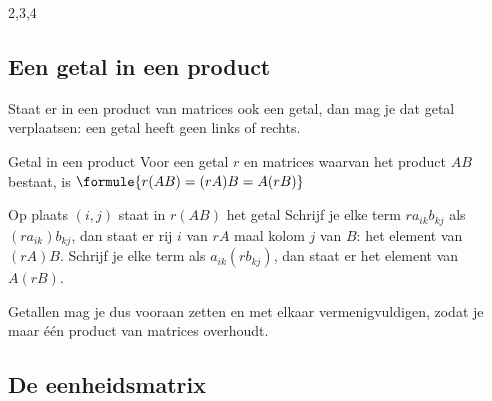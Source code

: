 \begin{alleenvoor}{2,3,4}
\subsection{Een getal in een product}

Staat er in een product van matrices ook een getal, dan mag je dat getal verplaatsen: een getal heeft geen links of rechts.

\begin{theorie}
\begin{stelling}{Getal in een product}
Voor een getal $r$ en matrices waarvan het product $AB$ bestaat, is \qquad $\formule{r(AB) = (rA)B = A(rB)}$
\end{stelling}

\begin{bewijs}
Op plaats $(i, j)$ staat in $r(AB)$ het getal
Schrijf je elke term $ra_{ik}b_{kj}$ als $(ra_{ik})b_{kj}$, dan staat er rij $i$ van $rA$ maal kolom $j$ van $B$: het element van $(rA)B$. Schrijf je elke term als $a_{ik}(rb_{kj})$, dan staat er het element van $A(rB)$.
\end{bewijs}
\end{theorie}

Getallen mag je dus vooraan zetten en met elkaar vermenigvuldigen, zodat je maar één product van matrices overhoudt.


\begin{oefeningen}
\end{oefeningen}

\subsection{De eenheidsmatrix}
\end{alleenvoor}
